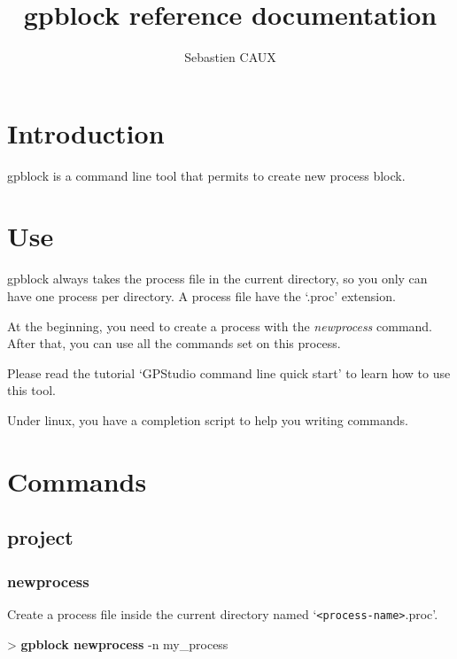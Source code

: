 \documentclass[10pt,a4paper]{article}
\author{Sebastien CAUX}
\title{gpblock reference documentation \version}
\begin{document}
\maketitle
\section{Introduction}
gpblock is a command line tool that permits to create new process block.

\section{Use}
gpblock always takes the process file in the current directory, so you only can have one process per directory. A process file have the `.proc' extension.

At the beginning, you need to create a process with the \emph{newprocess} command. After that, you can use all the commands set on this process.

Please read the tutorial `GPStudio command line quick start' to learn how to use this tool.

Under linux, you have a completion script to help you writing commands.

\section{Commands}
\subsection{project}
\subsubsection{newprocess}

Create a process file inside the current directory named `\texttt{<process-name>}.proc'.


\begin{sampletitle}
> \textbf{gpblock newprocess} -n my\_process
\end{sampletitle}

\end{document}
